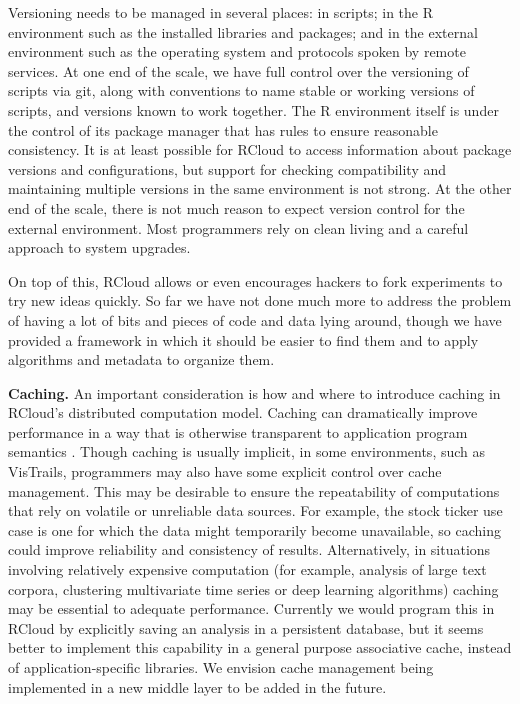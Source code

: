 Versioning needs to be managed in several places: in scripts;
in the R environment such as the installed libraries and packages;
and in the external environment such as the operating system and
protocols spoken by remote services. At one end of the scale, we have
full control over the versioning of scripts via git, along with conventions
to name stable or working versions of scripts, and versions known to work together.
The R environment itself is under the control of its package manager
that has rules to ensure reasonable consistency.
It is at least possible for RCloud to access information about
package versions and configurations, but support for checking compatibility
and maintaining multiple versions in the same environment is not strong.
At the other end of the scale, there is not much reason to expect version
control for the external environment. Most programmers rely on clean living
and a careful approach to system upgrades.

On top of this, RCloud allows or even encourages hackers to fork experiments
to try new ideas quickly. So far we have not done much more to address the
problem of having a lot of bits and pieces of code and data lying around,
though we have provided a framework in which it should be easier to find them
and to apply algorithms and metadata to organize them.


{\bf Caching.}
An important consideration is how and where to introduce caching
in RCloud's distributed computation model. Caching can dramatically
improve performance in a way that is otherwise transparent to
application program semantics \cite{Callahan:2006:VVM, Guo:2010:TPI}.
Though caching is usually implicit, in some environments, such as
VisTrails, programmers may also have some explicit control over cache
management. This may be desirable to ensure the repeatability of
computations that rely on volatile or unreliable data sources.
For example, the stock ticker use case is one for which the data
might temporarily become unavailable, so caching could improve
reliability and consistency of results. Alternatively, in situations
involving relatively expensive computation (for example, analysis of large
text corpora, clustering multivariate time series or deep learning algorithms)
caching may be essential to adequate performance. Currently we would
program this in RCloud by explicitly saving an analysis in a persistent database,
but it seems better to implement this capability in a general purpose associative
cache, instead of application-specific libraries. We envision cache management
being implemented in a new middle layer to be added in the future.

